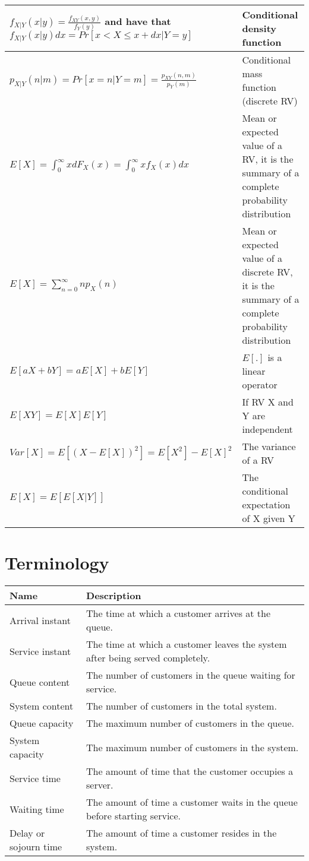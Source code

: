 \documentclass{article}
\begin{document}
\begin{longtable}{| p{7cm} | p{8cm} |}
    \hline
    $ f_{X|Y}(x|y) = \frac{f_{XY}(x, y)}{f_Y(y)} $ and have that $ f_{X|Y}(x|y)dx = Pr[x < X \le x + dx | Y = y] $& Conditional density function \\
    \hline
    $ p_{X|Y}(n|m) = Pr[x = n | Y = m] = \frac{p_{XY}(n,m)}{p_Y(m)} $ & Conditional mass function (discrete RV) \\
    \hline
    $ E[X] = \int_{0}^{\infty} x dF_X(x) = \int_{0}^{\infty} x f_X(x)dx $ & Mean or expected value of a RV, it is the summary of a complete probability distribution \\
    \hline
    $ E[X] = \sum_{n=0}^{\infty} n p_X (n)$ & Mean or expected value of a discrete RV, it is the summary of a complete probability distribution \\
    \hline
    $ E[aX + bY] = a E[X] + b E[Y]$ & $E[.]$ is a linear operator \\
    \hline
    $ E[XY] = E[X]E[Y]$ & If RV X and Y are independent \\
    \hline
    $ Var[X] = E[(X - E[X])^2] = E[X^2] - E[X]^2$ & The variance of a RV \\
    \hline
    $ E[X] = E[E[X|Y]]$ & The conditional expectation of X given Y \\
    \hline
\end{longtable}

\section{Terminology}

\begin{longtable}{| p{7cm} | p{8cm} |}
    \hline
    \textbf{Name} & \textbf{Description}  \\ \hline
    \endhead
    \hline
    \endfoot
	Arrival instant & The time at which a customer arrives at the queue. \\
    \hline
    Service instant & The time at which a customer leaves the system after being served completely. \\
    \hline
    Queue content & The number of customers in the queue waiting for service. \\
    \hline
    System content & The number of customers in the total system. \\
    \hline
    Queue capacity & The maximum number of customers in the queue. \\
    \hline
    System capacity & The maximum number of customers in the system. \\
    \hline
    Service time & The amount of time that the customer occupies a server. \\
    \hline
    Waiting time & The amount of time a customer waits in the queue before starting service. \\
    \hline
    Delay or sojourn time & The amount of time a customer resides in the system. \\
    \hline
\end{longtable}
\end{document}
